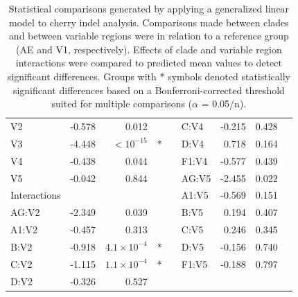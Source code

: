 \documentclass[12pt]{article}
\begin{document}
\begin{table}[htbp]
\begin{tabular}{lrrcclrrc}
  \hspace{1em}V2 & -0.578 & 0.012 &  & &\hspace{1em}C:V4 & -0.215 & 0.428 & \\ 
  \hspace{1em}V3 & -4.448 & $<10^{-15}$ & * &  &\hspace{1em}D:V4 & 0.718 & 0.164 &\\ 
  \hspace{1em}V4 & -0.438 & 0.044 & & &\hspace{1em}F1:V4 & -0.577 & 0.439 &  \\ 
  \hspace{1em}V5 & -0.042 & 0.844 & & &\hspace{1em}AG:V5 & -2.455 & 0.022 & \\ 
  Interactions & & & &&\hspace{1em}A1:V5 & -0.569 & 0.151 & \\ 
  \hspace{1em}AG:V2 & -2.349 & 0.039 & & &\hspace{1em}B:V5 & 0.194 & 0.407 & \\ 
  \hspace{1em}A1:V2 & -0.457 & 0.313 &  &&\hspace{1em}C:V5 & 0.246 & 0.345 & \\ 
  \hspace{1em}B:V2 & -0.918 & $4.1\times 10^{-4}$& * & &\hspace{1em}D:V5 & -0.156 & 0.740 & \\ 
  \hspace{1em}C:V2 & -1.115 & $1.1\times 10^{-4}$ & * & &\hspace{1em}F1:V5 & -0.188 & 0.797 & \\ 
  \hspace{1em}D:V2 & -0.326 & 0.527 &  & &\\  
  
  \hline
  \end{tabular}
  
  \caption{
    Statistical comparisons generated by applying a generalized linear model to cherry indel analysis. 
    Comparisons made between clades and between variable regions were in relation to a reference group (AE and V1, respectively). 
    Effects of clade and variable region interactions were compared to predicted mean values to detect significant differences. 
    Groups with * symbols denoted statistically significant differences based on a Bonferroni-corrected threshold suited for multiple comparisons ($\alpha$ = 0.05/n). 
    }
    \label{tab:glm}
\end{table}
\end{document}
